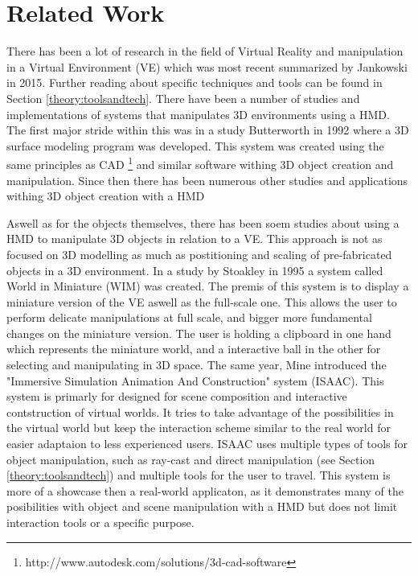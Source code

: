 \chapter{Related Work}
\label{relatedwork}
There has been a lot of research in the field of Virtual Reality and manipulation in a Virtual Environment (VE) which was most recent summarized by Jankowski in 2015. \cite{interactions:Jankowski2015} Further reading about specific techniques and tools can be found in Section \ref{theory:toolsandtech}. There have been a number of studies and implementations of systems that manipulates 3D environments using a HMD. The first major stride within this was in a study Butterworth in 1992 where a 3D surface modeling program was developed. \cite{relatedwork:Butterworth1992} This system was created using the same principles as CAD \footnote{http://www.autodesk.com/solutions/3d-cad-software} and similar software withing 3D object creation and manipulation. Since then there has been numerous other studies and applications withing 3D object creation with a HMD \cite{relatedwork:bowman1996conceptual} \cite{relatedwork:moshell1995research} \cite{relatedwork:liang1994jdcad}

Aswell as for the objects themselves, there has been soem studies about using a HMD to manipulate 3D objects in relation to a VE. This approach is not as focused on 3D modelling as much as postitioning and scaling of pre-fabricated objects in a 3D environment. In a study by Stoakley in 1995 a system called World in Miniature (WIM) was created.\cite{relatedwork:stoakley1995virtual} The premis of this system is to display a miniature version of the VE aswell as the full-scale one. This allows the user to perform delicate manipulations at full scale, and bigger more fundamental changes on the miniature version. The user is holding a clipboard in one hand which represents the miniature world, and a interactive ball in the other for selecting and manipulating in 3D space. The same year, Mine introduced the "Immersive Simulation
Animation And Construction" system (ISAAC).\cite{relatedwork:mine1995isaac} This system is primarly for designed for scene composition and interactive contstruction of virtual worlds. It tries to take advantage of the possibilities in the virtual world but keep the interaction scheme similar to the real world for easier adaptaion to less experienced users. ISAAC uses multiple types of tools for object manipulation, such as ray-cast and direct manipulation (see Section \ref{theory:toolsandtech}) and multiple tools for the user to travel. This system is more of a showcase then a real-world applicaton, as it demonstrates many of the posibilities with object and scene manipulation with a HMD but does not limit interaction tools or a specific purpose.

